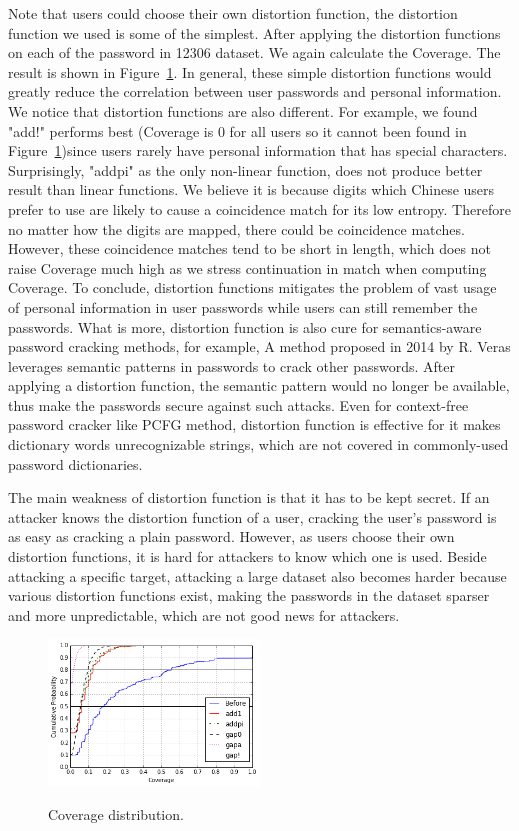 Note that users could choose their own distortion function, the distortion function we used is some of the simplest. After applying the distortion functions on each of the password in 12306 dataset. We again calculate the Coverage. The result is shown in Figure~\ref{f4}. In general, these simple distortion functions would greatly reduce the correlation between user passwords and personal information. We notice that distortion functions are also different. For example, we found "add!" performs best (Coverage is 0 for all users so it cannot been found in Figure~\ref{f4})since users rarely have personal information that has special characters. Surprisingly, "addpi" as the only non-linear function, does not produce better result than linear functions. We believe it is because digits which Chinese users prefer to use are likely to cause a coincidence match for its low entropy. Therefore no matter how the digits are mapped, there could be coincidence matches. However, these coincidence matches tend to be short in length, which does not raise Coverage much high as we stress continuation in match when computing Coverage. To conclude, distortion functions mitigates the problem of vast usage of personal information in user passwords while users can still remember the passwords. What is more, distortion function is also cure for semantics-aware password cracking methods, for example, A method \cite{veras2014semantic} proposed in 2014 by R. Veras leverages semantic patterns in passwords to crack other passwords. After applying a distortion function, the semantic pattern would no longer be available, thus make the passwords secure against such attacks. Even for context-free password cracker like PCFG method, distortion function is effective for it makes dictionary words unrecognizable strings, which are not covered in commonly-used password dictionaries. 

The main weakness of distortion function is that it has to be kept secret. If an attacker knows the distortion function of a user, cracking the user's password is as easy as cracking a plain password. However, as users choose their own distortion functions, it is hard for attackers to know which one is used. Beside attacking a specific target, attacking a large dataset also becomes harder because various distortion functions exist, making the passwords in the dataset sparser and more unpredictable, which are not good news for attackers.
 
 \begin{figure}[h!]
\centering
  \caption{Coverage distribution.}{}
  \label{f4}
  \centering
    \includegraphics[width=0.5\textwidth]{fig/dist2}
\end{figure}



